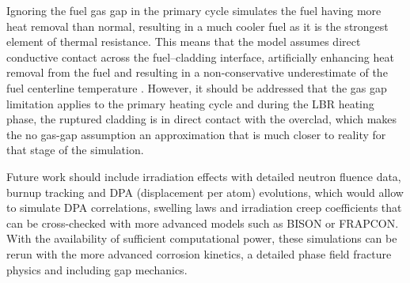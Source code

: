 Ignoring the fuel gas gap in the primary cycle simulates the fuel having more heat removal than normal, resulting in a much cooler fuel as it is the strongest element of thermal resistance. This means that the model assumes direct conductive contact across the fuel–cladding interface, artificially enhancing heat removal from the fuel and resulting in a non-conservative underestimate of the fuel centerline temperature %
\cite{Cohen1961MeasurementIrradiation}. However, it should be addressed that the gas gap limitation applies to the primary heating cycle and during the LBR heating phase, the ruptured cladding is in direct contact with the overclad, which makes the no gas-gap assumption an approximation that is much closer to reality for that stage of the simulation.

Future work should include irradiation effects with detailed neutron fluence data, burnup tracking and DPA (displacement per atom) evolutions, which would allow to simulate DPA correlations, swelling laws and irradiation creep coefficients that can be cross-checked with more advanced models such as BISON or FRAPCON. With the availability of sufficient computational power, these simulations can be rerun with the more advanced corrosion kinetics, a detailed phase field fracture physics and including gap mechanics.